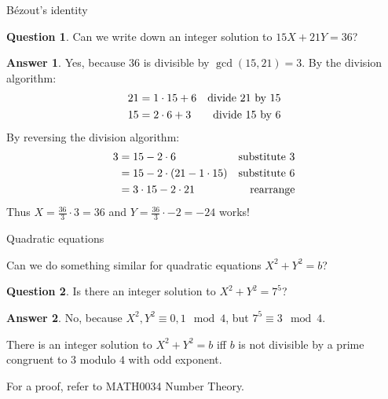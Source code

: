 \documentclass[10pt]{beamer}
\theoremstyle{definition}
\newtheorem{answer}{Answer}
\newtheorem{question}{Question}
\begin{document}
\begin{frame}[t]{B\'ezout's identity}

\begin{question}
Can we write down an integer solution to $ 15X + 21Y = 36 $?
\end{question}

\begin{answer}
Yes, because $ 36 $ is divisible by $ \gcd(15, 21) = 3 $. By the division algorithm:
\begin{align*}
21 & = 1 \cdot 15 + 6 & \text{divide $ 21 $ by $ 15 $} \\
15 & = 2 \cdot 6 + 3 & \text{divide $ 15 $ by $ 6 $}
\end{align*}
By reversing the division algorithm:
\begin{align*}
3 & = 15 - 2 \cdot 6 & \text{substitute $ 3 $} \\
& = 15 - 2 \cdot (21 - 1 \cdot 15) & \text{substitute $ 6 $} \\
& = 3 \cdot 15 - 2 \cdot 21 & \text{rearrange}
\end{align*}
Thus $ X = \tfrac{36}{3} \cdot 3 = 36 $ and $ Y = \tfrac{36}{3} \cdot -2 = -24 $ works!
\end{answer}

\end{frame}

\begin{frame}[t]{Quadratic equations}

Can we do something similar for quadratic equations $ X^2 + Y^2 = b $?

\vspace{0.5cm}

\begin{question}
Is there an integer solution to $ X^2 + Y^2 = 7^5 $?
\end{question}

\begin{answer}
No, because $ X^2, Y^2 \equiv 0, 1 \mod 4 $, but $ 7^5 \equiv 3 \mod 4 $.
\end{answer}

\vspace{0.5cm}

\begin{theorem}
There is an integer solution to $ X^2 + Y^2 = b $ iff $ b $ is not divisible by a prime congruent to $ 3 $ modulo $ 4 $ with odd exponent.
\end{theorem}

\vspace{0.5cm} For a proof, refer to MATH0034 Number Theory.

\end{frame}
\end{document}
